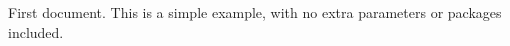 \documentclass{article}
\begin{document}
  First document. This is a simple example, with no extra parameters or packages included.
\end{document}

